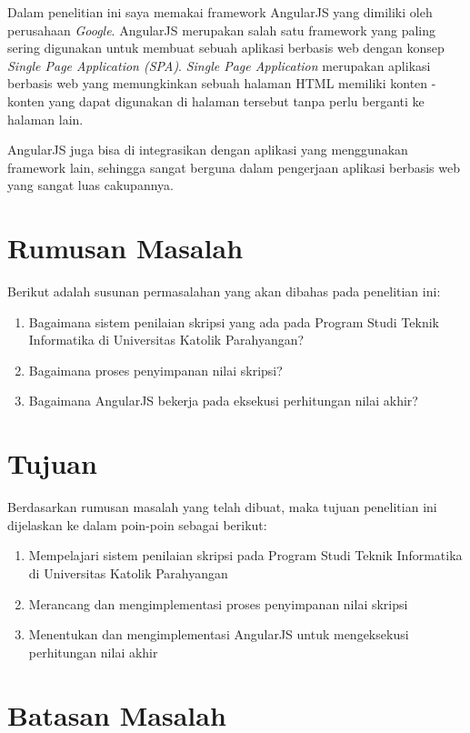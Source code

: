 	Dalam penelitian ini saya memakai framework AngularJS yang dimiliki oleh perusahaan \textit{Google}. AngularJS merupakan salah satu framework yang paling sering digunakan untuk membuat sebuah aplikasi berbasis web dengan konsep \textit{Single Page Application (SPA)}. \textit{Single Page Application} merupakan aplikasi berbasis web yang memungkinkan sebuah halaman HTML memiliki konten - konten yang dapat digunakan di halaman tersebut tanpa perlu berganti ke halaman lain.
	
	AngularJS juga bisa di integrasikan dengan aplikasi yang menggunakan framework lain, sehingga sangat berguna dalam pengerjaan aplikasi berbasis web yang sangat luas cakupannya.
	
\section{Rumusan Masalah}
\label{sec: rumusanMasalah}

	Berikut adalah susunan permasalahan yang akan dibahas pada penelitian ini:
	\begin{enumerate}
		\item Bagaimana sistem penilaian skripsi yang ada pada Program Studi Teknik Informatika di Universitas Katolik Parahyangan?
		\item Bagaimana proses penyimpanan nilai skripsi?
		\item Bagaimana AngularJS bekerja pada eksekusi perhitungan nilai akhir?
	\end{enumerate}

\section{Tujuan}
\label{sec: tujuan}

	Berdasarkan rumusan masalah yang telah dibuat, maka tujuan penelitian ini dijelaskan ke dalam poin-poin sebagai berikut:
	\begin{enumerate}
		\item Mempelajari sistem penilaian skripsi pada Program Studi Teknik Informatika di Universitas Katolik Parahyangan
		\item Merancang dan mengimplementasi proses penyimpanan nilai skripsi
		\item Menentukan dan mengimplementasi AngularJS untuk mengeksekusi perhitungan nilai akhir
	\end{enumerate}
	
\section{Batasan Masalah}
\label{sec: batasanMasalah}
	
